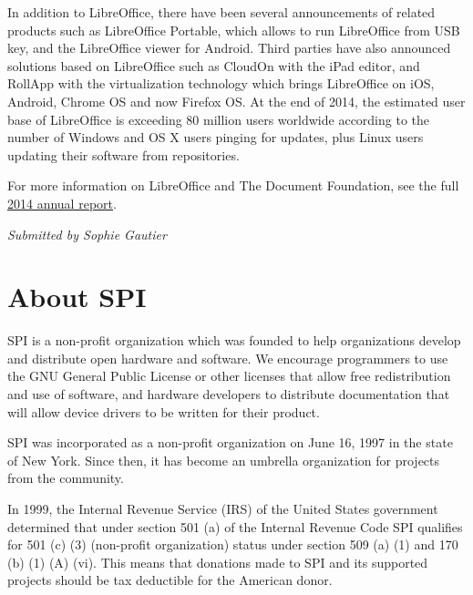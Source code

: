 \documentclass[letterpaper]{report}
\begin{document}
In addition to LibreOffice, there have been several announcements of
related products such as LibreOffice Portable, which allows to run
LibreOffice from USB key, and the LibreOffice viewer for Android. Third
parties have also announced solutions based on LibreOffice such as CloudOn
with the iPad editor, and RollApp with the virtualization technology which
brings LibreOffice on iOS, Android, Chrome OS and now Firefox OS. At the
end of 2014, the estimated user base of LibreOffice is exceeding 80 million
users worldwide according to the number of Windows and OS X users pinging
for updates, plus Linux users updating their software from repositories.

For more information on LibreOffice and The Document Foundation, see the
full
\href{https://wiki.documentfoundation.org/File:TDF2014AnnualReport.pdf}{2014
annual report}.

{\em Submitted by Sophie Gautier}


\appendix
\chapter{About SPI}

SPI is a non-profit organization which was founded to help organizations
develop and distribute open hardware and software. We encourage programmers
to use the GNU General Public License or other licenses that allow free
redistribution and use of software, and hardware developers to distribute
documentation that will allow device drivers to be written for their product.

SPI was incorporated as a non-profit organization on June 16, 1997 in the state
of New York. Since then, it has become an umbrella organization for projects
from the community.

In 1999, the Internal Revenue Service (IRS) of the United States government
determined that under section 501 (a) of the Internal Revenue Code SPI
qualifies for 501 (c) (3) (non-profit organization) status under section 509
(a) (1) and 170 (b) (1) (A) (vi). This means that donations made to SPI and its
supported projects should be tax deductible for the American donor.
\end{document}

